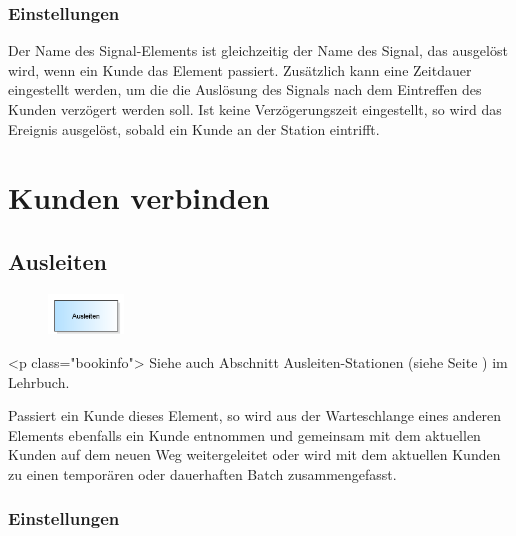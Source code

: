 \subsection*{Einstellungen}

Der Name des Signal-Elements ist gleichzeitig der Name des Signal, das ausgelöst wird, wenn ein Kunde das Element passiert.
Zusätzlich kann eine Zeitdauer eingestellt werden, um die die Auslösung des Signals nach dem Eintreffen des Kunden verzögert werden soll.
Ist keine Verzögerungszeit eingestellt, so wird das Ereignis ausgelöst, sobald ein Kunde an der Station eintrifft.





\chapter{Kunden verbinden}

\section{Ausleiten}
\label{ref:ModelElementPickUp}

\begin{figure}
\vspace{-22pt}
\includegraphics[width=2cm]{imageModelElementPickUp.png}
\vspace{-22pt}
\end{figure}

<p class="bookinfo">
Siehe auch Abschnitt Ausleiten-Stationen (siehe Seite \pageref{ref:book:8.2.9}) im Lehrbuch.

Passiert ein Kunde dieses Element, so wird aus der Warteschlange eines anderen Elements ebenfalls ein Kunde entnommen
und gemeinsam mit dem aktuellen Kunden auf dem neuen Weg weitergeleitet oder wird mit dem aktuellen Kunden
zu einen temporären oder dauerhaften Batch zusammengefasst.

\subsection*{Einstellungen}


